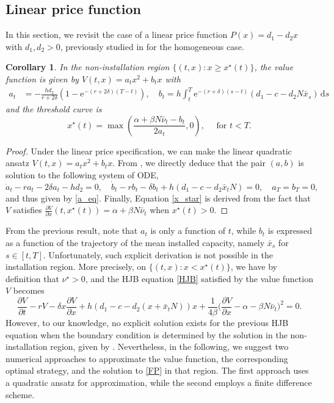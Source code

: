 \documentclass[12pt]{article}
\newtheorem{corollary}{Corollary}[section]
\def\erm{\mathrm{e}}
\def\drm{\mathrm{d}}
\begin{document}
\subsection{Linear price function}\label{linear_section}
In this section, we revisit the case of a linear price function $P(x)=d_1-d_2x$ with $d_1,d_2>0$, previously studied in  for the homogeneous case.
\begin{corollary}\label{cor:V_linear}
In the non-installation region $\{(t,x):x\geq x^\star(t)\}$, the value function is given by $V(t,x)=a_tx^2+b_tx$ with 
\begin{align}\label{a_eq}
    a_t &= -\frac{h d_2}{r + 2\delta} \left( 1 -  \erm^{-(r + 2\delta)(T - t)} \right), \quad 
b_t = h \int_{t}^{T} \erm^{-(r+\delta)(s-t)} (d_1-c-d_2N\bar{x}_s)\, \drm s
\end{align}
and the threshold curve is
\begin{equation}\label{x_star}
x^\star(t)=\max \left( \frac{\alpha+\beta N \bar{\nu}_t-b_t}{2a_t},0\right),\quad\text{ for }t<T.
\end{equation}
\end{corollary}
\begin{proof}
Under the linear price specification, we can make the linear quadratic ansatz $V(t,x)=a_tx^2+b_tx$. From , we directly deduce that the pair $(a,b)$ is solution to the following system of ODE,
\begin{equation*}
\dot{a}_t-ra_t-2\delta a_t-hd_2 =0, \quad 
\dot{b}_t-rb_t-\delta b_t+h(d_1-c-d_2\bar{x}_tN)=0, \quad a_T=b_T=0,
\end{equation*} 
and thus given by \eqref{a_eq}. Finally, Equation \eqref{x_star} is derived from the fact that $V$ satisfies $\frac{\partial V}{\partial x} {(t,x^\star{(t)})}=\alpha+\beta N\bar{\nu}_t$ when $x^\star(t)>0$.
\end{proof}

From the previous result, note that $a_t$ is only a function of $t$, while $b_t$ is expressed as a function of the trajectory of the mean installed capacity, namely $\bar{x}_s$ for $s \in [t,T]$. Unfortunately, such explicit derivation is not possible in the installation region. 
More precisely, on $\{(t,x):x< x^\star(t)\}$, we have by definition that $\nu^\star>0$, and the HJB equation \eqref{HJB} satisfied by the value function $V$ becomes
\begin{equation}\label{new_hjb}
\frac{\partial V}{\partial t}-rV-\delta x\frac{\partial V}{\partial x}+h(d_1-c-d_2(x+\bar{x}_tN))x+\frac{1}{4\beta} \bigg(\dfrac{\partial V }{\partial x}-\alpha-\beta N\bar{\nu}_t \bigg)^2=0.
\end{equation}
However, to our knowledge, no explicit solution exists for the previous HJB equation when the boundary condition is determined by the solution in the non-installation region, given by . Nevertheless, in the following, we suggest two numerical approaches to approximate the value function, the corresponding optimal strategy, and the solution to \eqref{FP} in that region. The first approach uses a quadratic ansatz for approximation, while the second employs a finite difference scheme.
\end{document}
